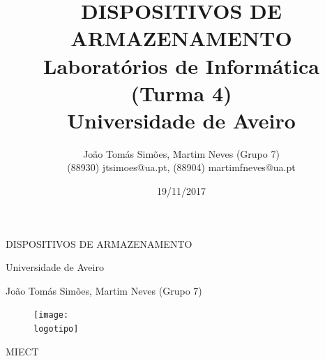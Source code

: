 \documentclass[a4paper]{report}
\begin{document}
\def\titulo{DISPOSITIVOS DE ARMAZENAMENTO}
\def\data{19/11/2017}
\def\autores{João Tomás Simões, Martim Neves (Grupo 7)}
\def\autorescontactos{(88930) jtsimoes@ua.pt, (88904) martimfneves@ua.pt}
\def\versao{MIECT}
\def\departamento{Laboratórios de Informática (Turma 4)}
\def\empresa{Universidade de Aveiro}
\def\logotipo{ua.pdf}

\begin{titlepage}

\begin{center}

\vspace*{50mm}

{\Huge \titulo}\\ 

\vspace{10mm}

{\Large \empresa}\\

\vspace{10mm}

{\LARGE \autores}\\ 

\vspace{30mm}

\begin{figure}[h]
\center
\texttt{[image: \\logotipo]}
\end{figure}

\vspace{30mm}
\end{center}

\begin{flushright}
\versao
\end{flushright}
\end{titlepage}


\title{
{\Huge\textbf{\titulo}}\\
\vspace{3mm}
{\Large \departamento\\ \empresa}
}

\author{
    \autores \\
    \autorescontactos
}

\date{\data}

\maketitle

\end{document}
